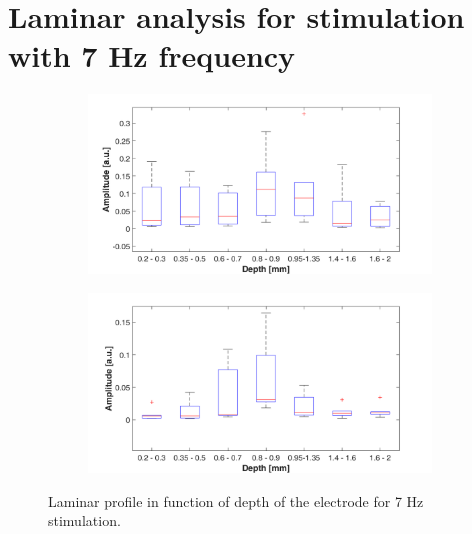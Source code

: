 \documentclass{pracalicmgr}
\begin{document}
\section{Laminar analysis for stimulation with 7 Hz frequency}  
   	\begin{figure}[H]
	\begin{subfigure}{.5\textwidth}
		\centering
		\includegraphics[width=1.\linewidth]{profile_7Hz_wid.png}
		\caption{}
		\label{rys:profil_7Hz_wid1}
	\end{subfigure}%
	\begin{subfigure}{.5\textwidth}
		\centering
		\includegraphics[width=1.\linewidth]{profile_7Hz_wid2.png}
		\caption{}
		\label{rys:profil_7Hz_wid2}
	\end{subfigure}
	
	\caption{Laminar profile in function of depth of the electrode for 7 Hz stimulation.}
	\label{rys:profil_7Hz_wid}
\end{figure}
\end{document}
